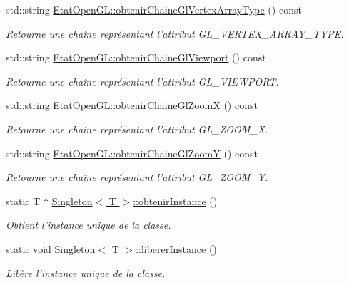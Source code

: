 \begin{DoxyCompactItemize}
std\-::string \hyperlink{group__utilitaire_ga27df79ce6a4279f818c5cd041e8dc6bd}{Etat\-Open\-G\-L\-::obtenir\-Chaine\-Gl\-Vertex\-Array\-Type} () const 
\begin{DoxyCompactList}\small\item\em Retourne une chaîne représentant l'attribut G\-L\-\_\-\-V\-E\-R\-T\-E\-X\-\_\-\-A\-R\-R\-A\-Y\-\_\-\-T\-Y\-P\-E. \end{DoxyCompactList}\item 
std\-::string \hyperlink{group__utilitaire_ga6afc9840c8a03deb6d741843bf82d28d}{Etat\-Open\-G\-L\-::obtenir\-Chaine\-Gl\-Viewport} () const 
\begin{DoxyCompactList}\small\item\em Retourne une chaîne représentant l'attribut G\-L\-\_\-\-V\-I\-E\-W\-P\-O\-R\-T. \end{DoxyCompactList}\item 
std\-::string \hyperlink{group__utilitaire_ga8ca35baf35a77d201c5a770a22aedbe8}{Etat\-Open\-G\-L\-::obtenir\-Chaine\-Gl\-Zoom\-X} () const 
\begin{DoxyCompactList}\small\item\em Retourne une chaîne représentant l'attribut G\-L\-\_\-\-Z\-O\-O\-M\-\_\-\-X. \end{DoxyCompactList}\item 
std\-::string \hyperlink{group__utilitaire_ga4231723bc8a26f191c53329dceed9222}{Etat\-Open\-G\-L\-::obtenir\-Chaine\-Gl\-Zoom\-Y} () const 
\begin{DoxyCompactList}\small\item\em Retourne une chaîne représentant l'attribut G\-L\-\_\-\-Z\-O\-O\-M\-\_\-\-Y. \end{DoxyCompactList}\item 
static T $\ast$ \hyperlink{group__utilitaire_ga349c289d77c484b8b4a180843d968b46}{Singleton$<$ T $>$\-::obtenir\-Instance} ()
\begin{DoxyCompactList}\small\item\em Obtient l'instance unique de la classe. \end{DoxyCompactList}\item 
static void \hyperlink{group__utilitaire_ga2b9ae943a004663d769be3f08ae35a0f}{Singleton$<$ T $>$\-::liberer\-Instance} ()
\begin{DoxyCompactList}\small\item\em Libère l'instance unique de la classe. \end{DoxyCompactList}\end{DoxyCompactItemize}


